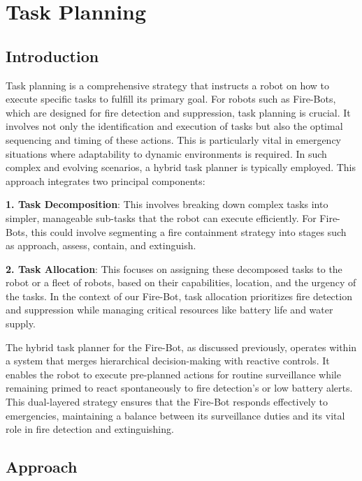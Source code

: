 \chapter{Task Planning}

\section{Introduction}
\label{sec:Introduction}


Task planning is a comprehensive strategy that instructs a robot on how to execute specific tasks to fulfill its primary goal. For robots such as Fire-Bots, which are designed for fire detection and suppression, task planning is crucial. It involves not only the identification and execution of tasks but also the optimal sequencing and timing of these actions. This is particularly vital in emergency situations where adaptability to dynamic environments is required.
In such complex and evolving scenarios, a hybrid task planner is typically employed. This approach integrates two principal components:

\textbf{1. Task Decomposition}: 
This involves breaking down complex tasks into simpler, manageable sub-tasks that the robot can execute efficiently. For Fire-Bots, this could involve segmenting a fire containment strategy into stages such as approach, assess, contain, and extinguish.

\textbf{2. Task Allocation}: 
This focuses on assigning these decomposed tasks to the robot or a fleet of robots, based on their capabilities, location, and the urgency of the tasks. In the context of our Fire-Bot, task allocation prioritizes fire detection and suppression while managing critical resources like battery life and water supply.

The hybrid task planner for the Fire-Bot, as discussed previously, operates within a system that merges hierarchical decision-making with reactive controls. It enables the robot to execute pre-planned actions for routine surveillance while remaining primed to react spontaneously to fire detection's or low battery alerts. This dual-layered strategy ensures that the Fire-Bot responds effectively to emergencies, maintaining a balance between its surveillance duties and its vital role in fire detection and extinguishing.



\section{Approach}
\label{sec:Approach}

